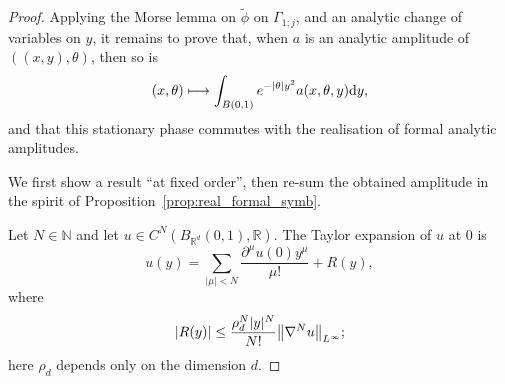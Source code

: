 \documentclass[10pt]{amsart}
\theoremstyle{definition}\newtheorem{defi}[theo]{Definition}\newtheorem{rema}[theo]{Remark}\newtheorem{exam}[theo]{Example}\newtheorem{exem}[theo]{Example}\newtheorem{nota}[theo]{Notation}
\newcommand\1{\mathds{1}}
\newcommand{\R}{\mathbb{R}}
\newcommand{\N}{\mathbb{N}}
\newcommand{\dd}{\mathrm{d}}
\let\oldmapsto\mapsto
\renewcommand*{\mapsto}{\mathchoice{\longmapsto}{\oldmapsto}{\oldmapsto}{\oldmapsto}}
\let\originalleft\left
\let\originalright\right
\renewcommand{\left}{\mathopen{}\mathclose\bgroup\originalleft}
\renewcommand{\right}{\aftergroup\egroup\originalright}
\begin{document}
\begin{proof}
Applying the Morse lemma on $\widetilde{\phi}$ on $\Gamma_{1;j}$, and an analytic change of variables on $y$, it remains to prove that, when $a$ is an analytic amplitude of $((x,y),\theta)$, then so is
\begin{equation}\label{eq:std_phase}
(x,\theta)\mapsto \int_{B(0,1)}e^{-|\theta|y^2}a(x,\theta,y)\dd y,
\end{equation}
and that this stationary phase commutes with the realisation of formal analytic amplitudes.

We first show a result ``at fixed order'', then re-sum the obtained amplitude in the spirit of Proposition~\ref{prop:real_formal_symb}.

Let $N\in \N$ and let $u\in C^N(B_{\R^d}(0,1),\R)$. The Taylor expansion of $u$ at $0$ is
\[
u(y)=\sum_{|\mu|<N}\frac{\partial^{\mu}u(0)y^{\mu}}{\mu!}+R(y),
\]
where
\[
|R(y)|\leq \frac{\rho_d^N|y|^N}{N!}\left\|\nabla^Nu\right\|_{L^{\infty}};
\]
here $\rho_d$ depends only on the dimension $d$.


\end{proof}
\end{document}
